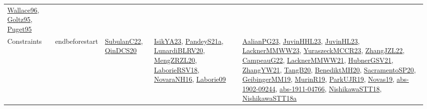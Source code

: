 {\begin{longtable}{lp{3cm}>{\raggedright}p{6cm}>{\raggedright}p{6cm}p{8cm}}
\href{articles/Wallace96.pdf}{Wallace96}\cite{Wallace96}, \href{papers/Goltz95.pdf}{Goltz95}\cite{Goltz95}, \href{papers/Puget95.pdf}{Puget95}\cite{Puget95}\\
Constraints & endbeforestart & \href{articles/SubulanC22.pdf}{SubulanC22}\cite{SubulanC22}, \href{articles/QinDCS20.pdf}{QinDCS20}\cite{QinDCS20} & \href{articles/IsikYA23.pdf}{IsikYA23}\cite{IsikYA23}, \href{articles/PandeyS21a.pdf}{PandeyS21a}\cite{PandeyS21a}, \href{articles/LunardiBLRV20.pdf}{LunardiBLRV20}\cite{LunardiBLRV20}, \href{articles/MengZRZL20.pdf}{MengZRZL20}\cite{MengZRZL20}, \href{articles/LaborieRSV18.pdf}{LaborieRSV18}\cite{LaborieRSV18}, \href{articles/NovaraNH16.pdf}{NovaraNH16}\cite{NovaraNH16}, \href{papers/Laborie09.pdf}{Laborie09}\cite{Laborie09} & \href{papers/AalianPG23.pdf}{AalianPG23}\cite{AalianPG23}, \href{papers/JuvinHHL23.pdf}{JuvinHHL23}\cite{JuvinHHL23}, \href{papers/JuvinHL23.pdf}{JuvinHL23}\cite{JuvinHL23}, \href{articles/LacknerMMWW23.pdf}{LacknerMMWW23}\cite{LacknerMMWW23}, \href{articles/YuraszeckMCCR23.pdf}{YuraszeckMCCR23}\cite{YuraszeckMCCR23}, \href{papers/ZhangJZL22.pdf}{ZhangJZL22}\cite{ZhangJZL22}, \href{articles/CampeauG22.pdf}{CampeauG22}\cite{CampeauG22}, \href{papers/LacknerMMWW21.pdf}{LacknerMMWW21}\cite{LacknerMMWW21}, \href{articles/HubnerGSV21.pdf}{HubnerGSV21}\cite{HubnerGSV21}, \href{articles/ZhangYW21.pdf}{ZhangYW21}\cite{ZhangYW21}, \href{papers/TangB20.pdf}{TangB20}\cite{TangB20}, \href{articles/BenediktMH20.pdf}{BenediktMH20}\cite{BenediktMH20}, \href{articles/SacramentoSP20.pdf}{SacramentoSP20}\cite{SacramentoSP20}, \href{papers/GeibingerMM19.pdf}{GeibingerMM19}\cite{GeibingerMM19}, \href{papers/MurinR19.pdf}{MurinR19}\cite{MurinR19}, \href{papers/ParkUJR19.pdf}{ParkUJR19}\cite{ParkUJR19}, \href{articles/Novas19.pdf}{Novas19}\cite{Novas19}, \href{articles/abs-1902-09244.pdf}{abs-1902-09244}\cite{abs-1902-09244}, \href{articles/abs-1911-04766.pdf}{abs-1911-04766}\cite{abs-1911-04766}, \href{papers/NishikawaSTT18.pdf}{NishikawaSTT18}\cite{NishikawaSTT18}, \href{papers/NishikawaSTT18a.pdf}{NishikawaSTT18a}\cite{NishikawaSTT18a}\\

\end{longtable}}
